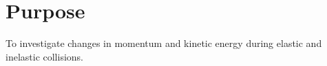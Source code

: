 
\section{Purpose}
To investigate changes in momentum and kinetic energy during elastic and inelastic collisions.